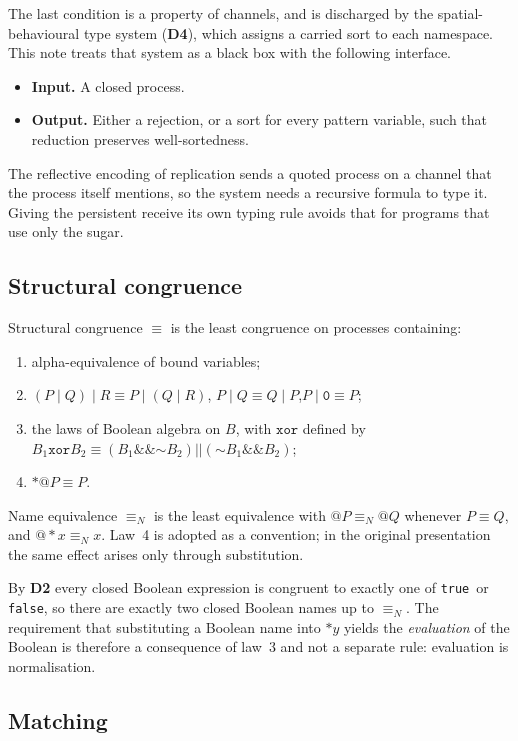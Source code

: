 \documentclass[10.5pt,a4paper]{extarticle}
\makeatletter
\newcommand{\kw}[1]{\texttt{#1}}
\newcommand{\nil}{\kw{0}}
\newcommand{\tru}{\kw{true}}
\newcommand{\fls}{\kw{false}}
\newcommand{\bnot}{\mathord{\sim}}
\newcommand{\band}{\mathbin{\&\&}}
\newcommand{\bor}{\mathbin{||}}
\newcommand{\bxor}{\mathbin{\kw{xor}}}
\newcommand{\quo}[1]{@#1}
\newcommand{\drp}[1]{{*}#1}
\newcommand{\cpar}{\mathbin{|}}
\newcommand{\scong}{\equiv}
\newcommand{\nameq}{\equiv_N}
\newcommand{\dec}[1]{\textbf{D#1}}
\theoremstyle{definition}
\theoremstyle{remark}
\makeatother
\begin{document}
The last condition is a property of channels, and is discharged by the
spatial-behavioural type system (\dec{4}), which assigns a carried sort to
each namespace. This note treats that system as a black box with the
following interface.
\begin{itemize}
\item \textbf{Input.} A closed process.
\item \textbf{Output.} Either a rejection, or a sort for every pattern
variable, such that reduction preserves well-sortedness.
\end{itemize}
The reflective encoding of replication sends a quoted process on a channel
that the process itself mentions, so the system needs a recursive formula to
type it. Giving the persistent receive its own typing rule avoids that for
programs that use only the sugar.

\subsection{Structural congruence}\label{sec:cong}

Structural congruence $\scong$ is the least congruence on processes
containing:
\begin{enumerate}
\item alpha-equivalence of bound variables;
\item $(P \cpar Q) \cpar R \scong P \cpar (Q \cpar R)$,\quad
      $P \cpar Q \scong Q \cpar P$,\quad $P \cpar \nil \scong P$;
\item the laws of Boolean algebra on $B$, with $\bxor$ defined by
      $B_1 \bxor B_2 \scong (B_1 \band \bnot B_2) \bor (\bnot B_1 \band B_2)$;
\item $\drp{\quo{P}} \scong P$.
\end{enumerate}
Name equivalence $\nameq$ is the least equivalence with
$\quo{P} \nameq \quo{Q}$ whenever $P \scong Q$, and $\quo{\drp{x}} \nameq x$.
Law~4 is adopted as a convention; in the original presentation the same
effect arises only through substitution.

By \dec{2} every closed Boolean expression is congruent to exactly one of
\tru\ or \fls, so there are exactly two closed Boolean names up to $\nameq$.
The requirement that substituting a Boolean name into $\drp{y}$ yields the
\emph{evaluation} of the Boolean is therefore a consequence of law~3 and not
a separate rule: evaluation is normalisation.

\subsection{Matching}\label{sec:matching}
\end{document}
